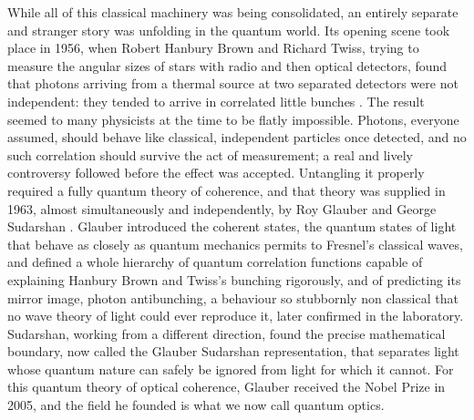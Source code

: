 	While all of this classical machinery was being consolidated, an entirely separate and
	stranger story was unfolding in the quantum world. Its opening scene took place in 1956,
	when Robert Hanbury Brown and Richard Twiss, trying to measure the angular sizes of
	stars with radio and then optical detectors, found that photons arriving from a thermal
	source at two separated detectors were not independent: they tended to arrive in
	correlated little bunches \cite{hanburybrown1956correlation}. The result seemed to many
	physicists at the time to be flatly impossible. Photons, everyone assumed, should behave
	like classical, independent particles once detected, and no such correlation should
	survive the act of measurement; a real and lively controversy followed before the effect
	was accepted. Untangling it properly required a fully quantum theory of coherence, and
	that theory was supplied in 1963, almost simultaneously and independently, by Roy Glauber
	\cite{glauber1963quantum} and George Sudarshan \cite{sudarshan1963equivalence}. Glauber
	introduced the coherent states, the quantum states of light that behave as closely as
	quantum mechanics permits to Fresnel's classical waves, and defined a whole hierarchy of
	quantum correlation functions capable of explaining Hanbury Brown and Twiss's bunching
	rigorously, and of predicting its mirror image, photon antibunching, a behaviour so
	stubbornly non classical that no wave theory of light could ever reproduce it, later
	confirmed in the laboratory. Sudarshan, working from a different direction, found the
	precise mathematical boundary, now called the Glauber Sudarshan representation, that
	separates light whose quantum nature can safely be ignored from light for which it
	cannot. For this quantum theory of optical coherence, Glauber received the Nobel Prize in
	2005, and the field he founded is what we now call quantum optics.

